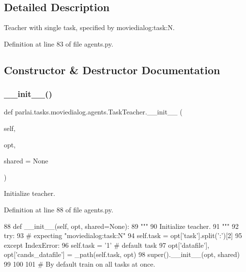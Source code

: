 \subsection{Detailed Description}
\begin{DoxyVerb}Teacher with single task, specified by moviedialog:task:N.
\end{DoxyVerb}
 

Definition at line 83 of file agents.\+py.



\subsection{Constructor \& Destructor Documentation}
\mbox{\label{classparlai_1_1tasks_1_1moviedialog_1_1agents_1_1TaskTeacher_a3cc846c9e289de305215cc30b6e1f1b0}} 
\subsubsection{\texorpdfstring{\+\_\+\+\_\+init\+\_\+\+\_\+()}{\_\_init\_\_()}}
{\footnotesize\ttfamily def parlai.\+tasks.\+moviedialog.\+agents.\+Task\+Teacher.\+\_\+\+\_\+init\+\_\+\+\_\+ (\begin{DoxyParamCaption}\item[{}]{self,  }\item[{}]{opt,  }\item[{}]{shared = {\ttfamily None} }\end{DoxyParamCaption})}

\begin{DoxyVerb}Initialize teacher.
\end{DoxyVerb}
 

Definition at line 88 of file agents.\+py.


\begin{DoxyCode}
88     \textcolor{keyword}{def }\_\_init\_\_(self, opt, shared=None):
89         \textcolor{stringliteral}{"""}
90 \textcolor{stringliteral}{        Initialize teacher.}
91 \textcolor{stringliteral}{        """}
92         \textcolor{keywordflow}{try}:
93             \textcolor{comment}{# expecting "moviedialog:task:N"}
94             self.task = opt[\textcolor{stringliteral}{'task'}].split(\textcolor{stringliteral}{':'})[2]
95         \textcolor{keywordflow}{except} IndexError:
96             self.task = \textcolor{stringliteral}{'1'}  \textcolor{comment}{# default task}
97         opt[\textcolor{stringliteral}{'datafile'}], opt[\textcolor{stringliteral}{'cands\_datafile'}] = \_path(self.task, opt)
98         super().\_\_init\_\_(opt, shared)
99 
100 
101 \textcolor{comment}{# By default train on all tasks at once.}
\end{DoxyCode}


